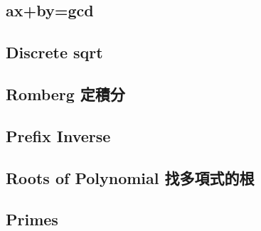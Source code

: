 \documentclass[a4paper,10pt,twocolumn,oneside]{article}
\begin{document}
\subsection{ax+by=gcd}


\subsection{Discrete sqrt}


% 

\subsection{Romberg 定積分}


%

\subsection{Prefix Inverse}


\subsection{Roots of Polynomial 找多項式的根}


% 

%

\subsection{Primes}

\end{document}
